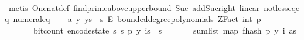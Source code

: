 \begin{isabellebody}
\ \ \ \ \isamarkupfalse%
\ {\isacharparenleft}{\kern0pt}metis\ One{\isacharunderscore}{\kern0pt}nat{\isacharunderscore}{\kern0pt}def\ find{\isacharunderscore}{\kern0pt}prime{\isacharunderscore}{\kern0pt}above{\isacharunderscore}{\kern0pt}upper{\isacharunderscore}{\kern0pt}bound\ Suc{\isacharunderscore}{\kern0pt}{}\ add{\isacharunderscore}{\kern0pt}Suc{\isacharunderscore}{\kern0pt}right\ linear\ not{\isacharunderscore}{\kern0pt}less{\isacharunderscore}{\kern0pt}eq{\isacharunderscore}{\kern0pt}eq\ numeral{\isacharunderscore}{\kern0pt}{}{\isacharunderscore}{\kern0pt}eq{\isacharunderscore}{\kern0pt}{}{\isacharparenright}{\kern0pt}\isanewline
\isanewline
\ \ \isamarkupfalse%
\ a{\isacharcolon}{\kern0pt}\ {\isachardoublequoteopen}{\isasymAnd}y{\isachardot}{\kern0pt}\ y{\isasymin}{\isacharbraceleft}{\kern0pt}{}{\isachardot}{\kern0pt}{\isachardot}{\kern0pt}{\isacharless}{\kern0pt}s\ {\isasymtimes}\ {\isacharbraceleft}{\kern0pt}{}{\isachardot}{\kern0pt}{\isachardot}{\kern0pt}{\isacharless}{\kern0pt}s\ {\isasymrightarrow}\isactrlsub E\ bounded{\isacharunderscore}{\kern0pt}degree{\isacharunderscore}{\kern0pt}polynomials\ {\isacharparenleft}{\kern0pt}ZFact\ {\isacharparenleft}{\kern0pt}int\ p{\isacharparenright}{\kern0pt}{\isacharparenright}{\kern0pt}\ {}\ {\isasymLongrightarrow}\isanewline
\ \ \ \ \ \ \ bit{\isacharunderscore}{\kern0pt}count\ {\isacharparenleft}{\kern0pt}encode{\isacharunderscore}{\kern0pt}state\ {\isacharparenleft}{\kern0pt}s\ s\ p{\isacharcomma}{\kern0pt}\ y{\isacharcomma}{\kern0pt}\ {\isasymlambda}i{\isasymin}{\isacharbraceleft}{\kern0pt}{}{\isachardot}{\kern0pt}{\isachardot}{\kern0pt}{\isacharless}{\kern0pt}s\ {\isasymtimes}\ {\isacharbraceleft}{\kern0pt}{}{\isachardot}{\kern0pt}{\isachardot}{\kern0pt}{\isacharless}{\kern0pt}s\ \isanewline
\ \ \ \ \ \ sum{\isacharunderscore}{\kern0pt}list\ {\isacharparenleft}{\kern0pt}map\ {\isacharparenleft}{\kern0pt}f{}{\isacharunderscore}{\kern0pt}hash\ p\ {\isacharparenleft}{\kern0pt}y\ i{\isacharparenright}{\kern0pt}{\isacharparenright}{\kern0pt}\ as{\isacharparenright}{\kern0pt}{\isacharparenright}{\kern0pt}{\isacharparenright}{\kern0pt}\isanewline

\end{isabellebody}
